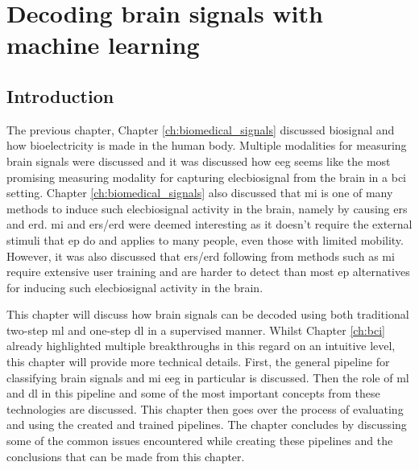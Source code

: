 \chapter{Decoding brain signals with machine learning}
\label{ch:processing_signals}

\section{Introduction}
\label{sec:processing_signals_introduction}

The previous chapter, Chapter \ref{ch:biomedical_signals} discussed \gls{biosignal} and how bioelectricity is made in the human body.
Multiple modalities for measuring brain signals were discussed and it was discussed how \gls{eeg} seems like the most promising measuring modality for capturing \gls{elecbiosignal} from the brain in a \gls{bci} setting.
Chapter \ref{ch:biomedical_signals} also discussed that \gls{mi} is one of many methods to induce such \gls{elecbiosignal} activity in the brain, namely by causing \gls{ers} and \gls{erd}.
\gls{mi} and \gls{ers}/\gls{erd} were deemed interesting as it doesn't require the external stimuli that \gls{ep} do and applies to many people, even those with limited mobility.
However, it was also discussed that \gls{ers}/\gls{erd} following from methods such as \gls{mi} require extensive user training and are harder to detect than most \gls{ep} alternatives for inducing such \gls{elecbiosignal} activity in the brain.

This chapter will discuss how brain signals can be decoded using both traditional two-step \gls{ml} and one-step \gls{dl} in a supervised manner.
Whilst Chapter \ref{ch:bci} already highlighted multiple breakthroughs in this regard on an intuitive level, this chapter will provide more technical details.
First, the general pipeline for classifying brain signals and \gls{mi} \gls{eeg} in particular is discussed.
Then the role of \gls{ml} and \gls{dl} in this pipeline and some of the most important concepts from these technologies are discussed.
This chapter then goes over the process of evaluating and using the created and trained pipelines.
The chapter concludes by discussing some of the common issues encountered while creating these pipelines and the conclusions that can be made from this chapter.


